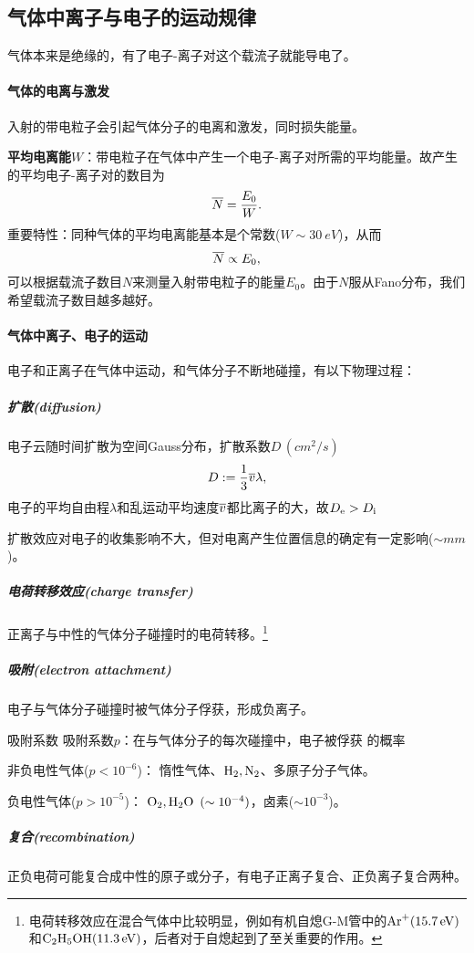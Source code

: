 \subsection{气体中离子与电子的运动规律}
气体本来是绝缘的，有了电子-离子对这个载流子就能导电了。
\paragraph{气体的电离与激发}
入射的带电粒子会引起气体分子的电离和激发，同时损失能量。%

\textbf{平均电离能}$W$：带电粒子在气体中产生一个电子-离子对所需的平均能量。故产生的平均电子-离子对的数目为
\begin{align}
	\overline N=\frac{E_0}W.
\end{align}
重要特性：同种气体的平均电离能基本是个常数($W\sim\SI{30}{eV}$)，从而
\[
	\overline N\propto E_0,
\]
可以根据载流子数目$N$来测量入射带电粒子的能量$E_0$。由于$N$服从Fano分布，我们希望载流子数目越多越好。



\paragraph{气体中离子、电子的运动}
电子和正离子在气体中运动，和气体分子不断地碰撞，有以下物理过程：
\subparagraph{扩散(diffusion)}
电子云随时间扩散为空间Gauss分布，扩散系数$D\,(\si{cm^2/s})$
\[
	D:=\frac13\overline v\lambda,
\]
电子的平均自由程$\lambda$和乱运动平均速度$\overline v$都比离子的大，故$D_\mathrm e>D_{\mathrm{i}}$

扩散效应对电子的收集影响不大，但对电离产生位置信息的确定有一定影响($\sim\si{mm}$)。
\subparagraph{电荷转移效应(charge transfer)}
正离子与中性的气体分子碰撞时的电荷转移。\footnote{电荷转移效应在混合气体中比较明显，例如有机自熄G-M管中的$\mathrm{Ar}^+(\SI{15.7}{eV})$和$\mathrm{C_2H_5OH}(\SI{11.3}{eV})$，后者对于自熄起到了至关重要的作用。}

\subparagraph{吸附(electron attachment)}
电子与气体分子碰撞时被气体分子俘获，形成负离子。
\begin{definition}{吸附系数}{}
	吸附系数$p$：在与气体分子的每次碰撞中，电子被俘获%
	的概率%
	\begin{compactitem}
		\item 非负电性气体($p<10^{-6}$)：
		惰性气体、$\mathrm{H}_2,\mathrm{N}_2$、多原子分子气体。
		\item 负电性气体($p>10^{-5}$)：
		$\mathrm{O_2,H_2O}\enspace (\sim 10^{-4})$，卤素($\sim 10^{-3}$)。
	\end{compactitem}
\end{definition}
\subparagraph{复合(recombination)}
正负电荷可能复合成中性的原子或分子，有电子正离子复合、正负离子复合两种。

